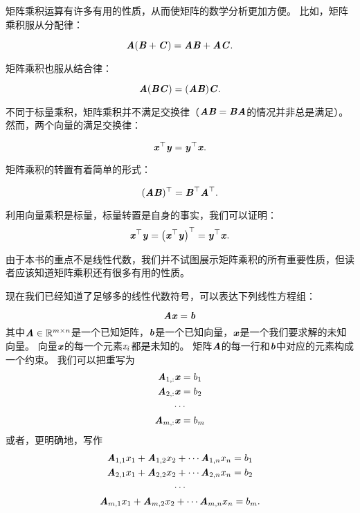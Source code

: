 矩阵乘积运算有许多有用的性质，从而使矩阵的数学分析更加方便。
比如，矩阵乘积服从分配律：


\begin{equation}
    \MA(\MB+\MC)=\MA\MB +\MA\MC.
\end{equation}


矩阵乘积也服从结合律：


\begin{equation}
\MA(\MB\MC)=(\MA\MB)\MC.
\end{equation}




不同于标量乘积，矩阵乘积并不满足交换律（$\MA\MB=\MB\MA$的情况并非总是满足）。
然而，两个向量的满足交换律：


\begin{equation}
\label{eq:2.8}
\Vx^\top\Vy=\Vy^\top\Vx.
\end{equation}


矩阵乘积的转置有着简单的形式：


\begin{equation}
(\MA\MB)^\top=\MB^\top\MA^\top.
\end{equation}


利用向量乘积是标量，标量转置是自身的事实，我们可以证明：
\begin{equation}
    \Vx^\top \Vy = \left(\Vx^\top \Vy \right)^\top = \Vy^\top \Vx.
\end{equation}


由于本书的重点不是线性代数，我们并不试图展示矩阵乘积的所有重要性质，但读者应该知道矩阵乘积还有很多有用的性质。


现在我们已经知道了足够多的线性代数符号，可以表达下列线性方程组：


\begin{equation}
\label{eq:2.11}
\MA\Vx=\Vb
\end{equation}
其中$\MA\in \SetR^{m\times n}$是一个已知矩阵，$\Vb$是一个已知向量，$\Vx$是一个我们要求解的未知向量。
向量$\Vx$的每一个元素$\Sx_i$都是未知的。
矩阵$\MA$的每一行和$\Vb$中对应的元素构成一个约束。
我们可以把重写为
\begin{gather}
\MA_{1,:}\Vx=b_1\\
\MA_{2,:}\Vx=b_2 \\
\cdots \\
\MA_{m,:}\Vx=b_m
\end{gather}
或者，更明确地，写作
\begin{gather}
    \MA_{1,1}x_1+\MA_{1,2}x_2+\cdots \MA_{1,n}x_n = b_1\\
    \MA_{2,1}x_1+\MA_{2,2}x_2+\cdots \MA_{2,n}x_n = b_2\\
    \cdots\\
    \MA_{m,1}x_1+\MA_{m,2}x_2+\cdots \MA_{m,n}x_n = b_m.
\end{gather}


